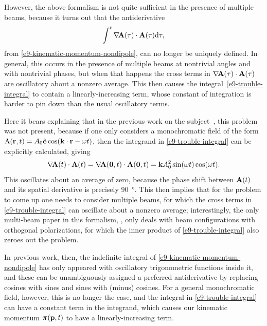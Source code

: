 However, the above formalism is not quite sufficient in the presence of multiple beams, because it turns out that the antiderivative 
\begin{equation}
\int^t\nabla\!\vb{A}(\tau) \cdot \vb{A}(\tau)\mathrm{d}\tau,
\label{e9-trouble-integral}
\end{equation}
from \eqref{e9-kinematic-momentum-nondipole}, can no longer be uniquely defined. In general, this occurs in the presence of multiple beams at nontrivial angles and with nontrivial phases, but when that happens the cross terms in $\nabla\!\vb{A}(\tau) \cdot \vb{A}(\tau)$ are oscillatory about a nonzero average. This then causes the integral~\eqref{e9-trouble-integral} to contain a linearly-increasing term, whose constant of integration is harder to pin down than the usual oscillatory terms.

Here it bears explaining that in the previous work on the subject~\cite{kylstra_photon_2001, kylstra_photon_2002, chirila_analysis_2004, chirila_nondipole_2002}, this problem was not present, because if one only considers a monochromatic field of the form $\mathrm{A}(\vb{r},t)=A_0\hat{\vb{e}} \cos(\vb{k}\cdot \vb{r} -\omega t)$, then the integrand in \eqref{e9-trouble-integral} can be explicitly calculated, giving
\begin{align}
\nabla\!\vb{A}(t) \cdot \vb{A}(t) 
=
\nabla\!\vb{A}(\vb0,t) \cdot \vb{A}(\vb0,t) 
=  
\vb{k} A_0^2 \sin(\omega t)\cos(\omega t)
.
\end{align}
This oscillates about an average of zero, because the phase shift  between $\vb{A}(t)$ and its spatial derivative is precisely \SI{90}{\degree}. This then implies that for the problem to come up one needs to consider multiple beams, for which the cross terms in \eqref{e9-trouble-integral} can oscillate about a nonzero average; interestingly, the only multi-beam paper in this formalism, , only deals with beam configurations with orthogonal polarizations, for which the inner product of \eqref{e9-trouble-integral} also zeroes out the problem. 

In previous work, then, the indefinite integral of \eqref{e9-kinematic-momentum-nondipole} has only appeared with oscillatory trigonometric functions inside it, and these can be unambiguously assigned a preferred antiderivative by replacing cosines with sines and sines with (minus) cosines. For a general monochromatic field, however, this is no longer the case, and the integral in \eqref{e9-trouble-integral} can have a constant term in the integrand, which causes our kinematic momentum $\boldsymbol{\pi}(\vb{p},t)$ to have a linearly-increasing term.



